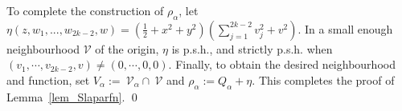 \documentclass[10pt]{amsart}
\numberwithin{equation}{section}
\theoremstyle{definition}
\theoremstyle{definition}
\theoremstyle{plain}
\newcommand{\V}{\mathcal{V}}
\begin{document}
To complete the construction of $\rho_\alpha$, let $
		\eta(z,w_1,...,w_{2k-2},w)
			=\left(\frac{1}{2}+x^2+y^2\right)\left(\sum_{j=1}^{2k-2}v_j^2+v^2\right)$.
In a small enough neighbourhood $\V$ of the origin, $\eta$ is p.s.h., and strictly p.s.h. when $(v_1,\cdots,v_{2k-2},v)\neq (0,\cdots,0,0)$. Finally, to obtain the desired neighbourhood and function, set $V_\alpha:=~\V_\alpha\cap~\V$ and $\rho_\alpha:=Q_\alpha+\eta$. This completes the proof of Lemma~\ref{lem_Slaparfn}.
\qed



%
\end{document}
